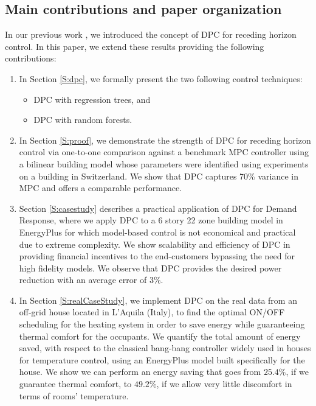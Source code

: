 \subsection{Main contributions and paper organization}
In our previous work \cite{Behl2016,Jain2016,JainACC2017,JainCDC2017}, we introduced the concept of DPC for receding horizon control. In this paper, we extend these results providing the following contributions:
\begin{enumerate}
	\item In Section \ref{S:dpc}, we formally present the two following control techniques:
	\begin{itemize}
		\item DPC with regression trees, and
		\item DPC with random forests.
	\end{itemize}
	\item In Section \ref{S:proof}, we demonstrate the strength of DPC for receding horizon control via one-to-one comparison against a benchmark MPC controller using a bilinear building model whose parameters were identified using experiments on a building in Switzerland. We show that DPC captures 70\% variance in MPC and offers a comparable performance.
	\item Section \ref{S:casestudy} describes a practical application of DPC for Demand Response, where we apply DPC to a 6 story 22 zone building model in EnergyPlus \cite{Crawley2001} for which model-based control is not economical and practical due to extreme complexity. We show scalability and efficiency of DPC in providing financial incentives to the end-customers bypassing the need for high fidelity models. We observe that DPC provides the desired power reduction with an average error of 3\%.
	\item In Section \ref{S:realCaseStudy}, we implement DPC on the real data from an off-grid house located in L'Aquila (Italy), to find the optimal ON/OFF scheduling for the heating system in order to save energy while guaranteeing thermal comfort for the occupants. We quantify the total amount of energy saved, with respect to the classical bang-bang controller widely used in houses for temperature control, using an EnergyPlus model built specifically for the house. We show we can perform an energy saving that goes from $25.4\%$, if we guarantee thermal comfort, to $49.2\%$, if we allow very little discomfort in terms of rooms' temperature.
\end{enumerate}


